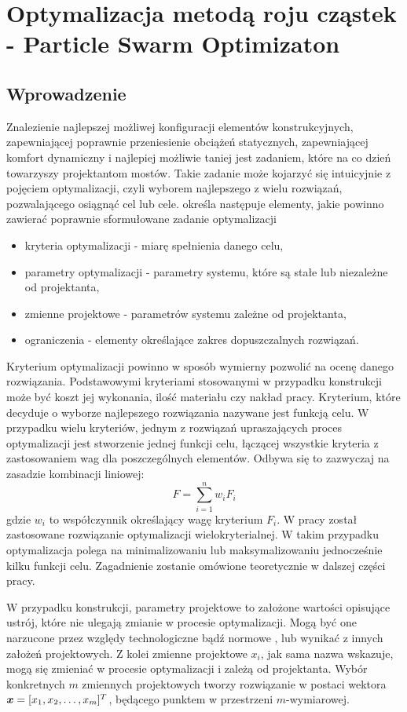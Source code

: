 \chapter{Optymalizacja metodą roju cząstek - Particle Swarm Optimizaton}
\section*{Wprowadzenie}
Znalezienie najlepszej możliwej konfiguracji elementów konstrukcyjnych, zapewniającej poprawnie przeniesienie obciążeń statycznych, zapewniającej komfort dynamiczny i najlepiej możliwie taniej jest zadaniem, które na co dzień towarzyszy projektantom mostów. Takie zadanie może kojarzyć się intuicyjnie z pojęciem optymalizacji, czyli wyborem najlepszego z wielu rozwiązań, pozwalającego osiągnąć cel lub cele. \cite{Szymczak1995} określa następuje elementy, jakie powinno zawierać poprawnie sformułowane zadanie optymalizacji
\begin{itemize}[noitemsep]
	\item kryteria optymalizacji - miarę spełnienia danego celu,
	\item parametry optymalizacji - parametry systemu, które są stałe lub niezależne od projektanta, 
	\item zmienne projektowe - parametrów systemu zależne od projektanta,
	\item ograniczenia - elementy określające zakres dopuszczalnych rozwiązań. 
\end{itemize}
Kryterium optymalizacji powinno w sposób wymierny pozwolić na ocenę danego rozwiązania. Podstawowymi kryteriami stosowanymi w przypadku konstrukcji może być koszt jej wykonania, ilość materiału czy nakład pracy. Kryterium, które decyduje o wyborze najlepszego rozwiązania nazywane jest funkcją celu. W przypadku wielu kryteriów, jednym z rozwiązań upraszających proces optymalizacji jest stworzenie jednej funkcji celu, łączącej wszystkie kryteria z zastosowaniem wag dla poszczególnych elementów. Odbywa się to zazwyczaj na zasadzie kombinacji liniowej:
\begin{equation}
	F=\sum_{i=1}^{n}w_i F_i
\end{equation}
gdzie $w_i$ to współczynnik określający wagę kryterium $F_i$. W pracy został zastosowane rozwiązanie optymalizacji wielokryterialnej. W takim przypadku optymalizacja polega na minimalizowaniu lub maksymalizowaniu jednocześnie kilku funkcji celu. Zagadnienie zostanie omówione teoretycznie w dalszej części pracy. 

W przypadku konstrukcji, parametry projektowe to założone wartości opisujące ustrój, które nie ulegają zmianie w procesie optymalizacji.  Mogą być one narzucone przez względy technologiczne bądź normowe \parencite{Szymczak1995}, lub wynikać z innych założeń projektowych. Z kolei zmienne projektowe $x_i$, jak sama nazwa wskazuje, mogą się zmieniać w procesie optymalizacji i zależą od projektanta. Wybór konkretnych $m$ zmiennych projektowych tworzy rozwiązanie w postaci wektora $\bm{x}=[x_1,x_2,\dots,x_m]^T$, będącego punktem w przestrzeni $m$-wymiarowej.

